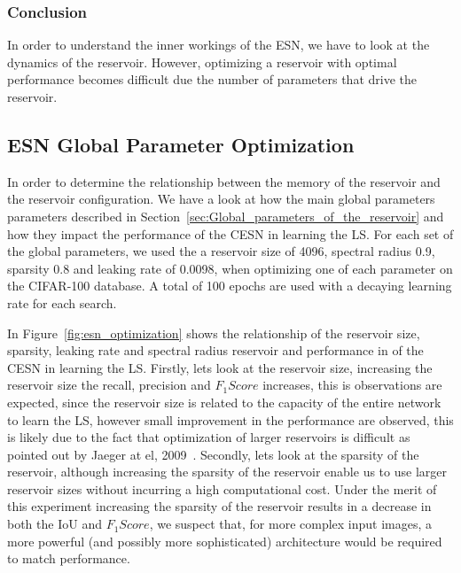 \documentclass{WitsPhysicsReport}
\begin{document}
\subsubsection{Conclusion}
In order to understand  the inner workings of the ESN, we have to look at the dynamics of the reservoir. However, optimizing a reservoir with optimal performance becomes difficult due the number of parameters that drive the reservoir.

\subsection{ESN Global Parameter Optimization}
In order to determine the relationship  between the memory of the reservoir and the  reservoir configuration.  We have a look at how the main global parameters parameters described in Section~\ref{sec:Global_parameters_of_the_reservoir} and how they impact the performance of the CESN in learning the LS. For each set of the global parameters, we used the a reservoir size of 4096, spectral radius 0.9, sparsity 0.8 and leaking rate of 0.0098, when optimizing one of each parameter on the CIFAR-100 database. A total of 100 epochs are used with a decaying learning rate for each search.


In Figure~\ref{fig:esn_optimization} shows the relationship of the reservoir size, sparsity, leaking rate and spectral radius reservoir and performance in of the CESN in learning the LS.  Firstly, lets look at the reservoir size, increasing the reservoir size the recall, precision and $F_{1}Score$ increases, this is observations are expected, since the reservoir size is related to the capacity of the entire network to learn the LS, however small improvement in the performance are observed, this is likely due to the fact that optimization of larger reservoirs is difficult as pointed out by Jaeger at el, 2009~\cite{jaeger2002tutorial}. Secondly, lets look at the sparsity of the reservoir, although increasing the sparsity of the reservoir enable us to use larger reservoir sizes without incurring a high computational cost. Under the merit of this experiment increasing the sparsity of the reservoir results in a decrease in both the IoU and $F_{1}Score$, we suspect that, for more complex input images, a more powerful (and possibly more sophisticated) architecture would be required to match performance. 
\end{document}
